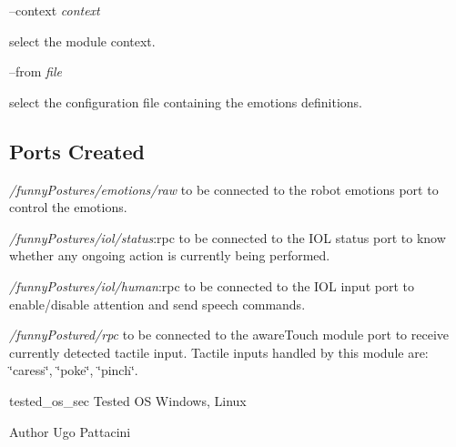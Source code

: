 --context {\itshape context} 
\begin{DoxyItemize}
\item select the module context.
\end{DoxyItemize}

--from {\itshape file} 
\begin{DoxyItemize}
\item select the configuration file containing the emotions definitions.
\end{DoxyItemize}\hypertarget{group__icub__iCubWriter_portsc_sec}{}\subsection{Ports Created}\label{group__icub__iCubWriter_portsc_sec}
{\itshape /funny\+Postures/emotions/raw} to be connected to the robot emotions port to control the emotions.

{\itshape /funny\+Postures/iol/status}\+:rpc to be connected to the I\+OL status port to know whether any ongoing action is currently being performed.

{\itshape /funny\+Postures/iol/human}\+:rpc to be connected to the I\+OL input port to enable/disable attention and send speech commands.

{\itshape /funny\+Postured/rpc} to be connected to the aware\+Touch module port to receive currently detected tactile input. Tactile inputs handled by this module are\+: \char`\"{}caress\char`\"{}, \char`\"{}poke\char`\"{}, \char`\"{}pinch\char`\"{}.

tested\+\_\+os\+\_\+sec Tested OS Windows, Linux

\begin{DoxyAuthor}{Author}
Ugo Pattacini 
\end{DoxyAuthor}
